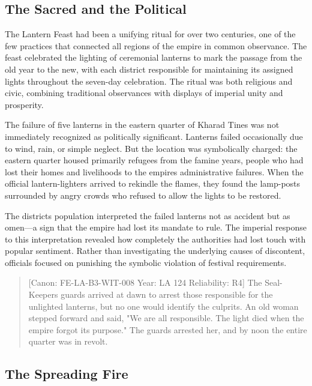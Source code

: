 \subsection{The Sacred and the
Political}\label{the-sacred-and-the-political}

The Lantern Feast had been a unifying ritual for over two centuries, one
of the few practices that connected all regions of the empire in common
observance. The feast celebrated the lighting of ceremonial lanterns to
mark the passage from the old year to the new, with each district
responsible for maintaining its assigned lights throughout the seven-day
celebration. The ritual was both religious and civic, combining
traditional observances with displays of imperial unity and prosperity.

The failure of five lanterns in the eastern quarter of Kharad Tines was
not immediately recognized as politically significant. Lanterns failed
occasionally due to wind, rain, or simple neglect. But the location was
symbolically charged: the eastern quarter housed primarily refugees from
the famine years, people who had lost their homes and livelihoods to the
empire\textquotesingle s administrative failures. When the official
lantern-lighters arrived to rekindle the flames, they found the
lamp-posts surrounded by angry crowds who refused to allow the lights to
be restored.

The district\textquotesingle s population interpreted the failed
lanterns not as accident but as omen---a sign that the empire had lost
its mandate to rule. The imperial response to this interpretation
revealed how completely the authorities had lost touch with popular
sentiment. Rather than investigating the underlying causes of
discontent, officials focused on punishing the symbolic violation of
festival requirements.

\begin{quote}
{[}Canon: FE-LA-B3-WIT-008 \textbar{} Year: LA 124 \textbar{}
Reliability: R4{]} The Seal-Keeper\textquotesingle s guards arrived at
dawn to arrest those responsible for the unlighted lanterns, but no one
would identify the culprits. An old woman stepped forward and said, "We
are all responsible. The light died when the empire forgot its purpose."
The guards arrested her, and by noon the entire quarter was in revolt.
\end{quote}

\subsection{The Spreading Fire}\label{the-spreading-fire}

